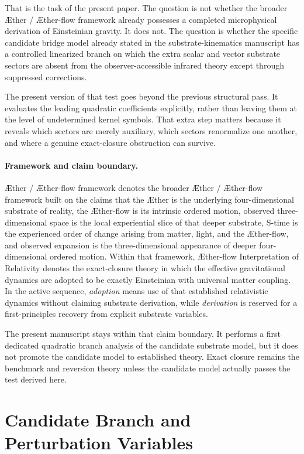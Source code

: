 \documentclass[11pt]{article}
\newcommand{\Aether}{\AE{}ther}
\newcommand{\Aflow}{\AE{}ther-flow}
\newcommand{\TheoryName}{\Aflow{} Interpretation of Relativity}
\newcommand{\TheoryProgram}{\Aether{} / \Aflow{} framework}
\begin{document}
That is the task of the present paper. The question is not whether the broader \Aether{} / \Aflow{} framework already possesses a completed microphysical derivation of Einsteinian gravity. It does not. The question is whether the specific candidate bridge model already stated in the substrate-kinematics manuscript has a controlled linearized branch on which the extra scalar and vector substrate sectors are absent from the observer-accessible infrared theory except through suppressed corrections.

The present version of that test goes beyond the previous structural pass. It evaluates the leading quadratic coefficients explicitly, rather than leaving them at the level of undetermined kernel symbols. That extra step matters because it reveals which sectors are merely auxiliary, which sectors renormalize one another, and where a genuine exact-closure obstruction can survive.

\paragraph{Framework and claim boundary.}
\TheoryProgram{} denotes the broader \Aether{} / \Aflow{} framework built on the claims that the \Aether{} is the underlying four-dimensional substrate of reality, the \Aflow{} is its intrinsic ordered motion, observed three-dimensional space is the local experiential slice of that deeper substrate, S-time is the experienced order of change arising from matter, light, and the \Aflow{}, and observed expansion is the three-dimensional appearance of deeper four-dimensional ordered motion. Within that framework, \TheoryName{} denotes the exact-closure theory in which the effective gravitational dynamics are adopted to be exactly Einsteinian with universal matter coupling. In the active sequence, \emph{adoption} means use of that established relativistic dynamics without claiming substrate derivation, while \emph{derivation} is reserved for a first-principles recovery from explicit substrate variables.

The present manuscript stays within that claim boundary. It performs a first dedicated quadratic branch analysis of the candidate substrate model, but it does not promote the candidate model to established theory. Exact closure remains the benchmark and reversion theory unless the candidate model actually passes the test derived here.

\section{Candidate Branch and Perturbation Variables}
\end{document}
